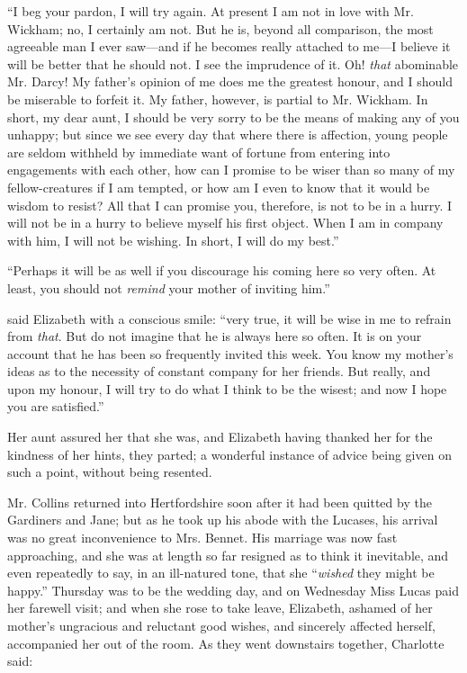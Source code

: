 “I beg your pardon, I will try again. At present I am not in love with Mr. Wickham; no, I certainly am not. But he is, beyond all comparison, the most agreeable man I ever saw---and if he becomes really attached to me---I believe it will be better that he should not. I see the imprudence of it. Oh! {\em that} abominable Mr. Darcy! My father's opinion of me does me the greatest honour, and I should be miserable to forfeit it. My father, however, is partial to Mr. Wickham. In short, my dear aunt, I should be very sorry to be the means of making any of you unhappy; but since we see every day that where there is affection, young people are seldom withheld by immediate want of fortune from entering into engagements with each other, how can I promise to be wiser than so many of my fellow-creatures if I am tempted, or how am I even to know that it would be wisdom to resist? All that I can promise you, therefore, is not to be in a hurry. I will not be in a hurry to believe myself his first object. When I am in company with him, I will not be wishing. In short, I will do my best.”

“Perhaps it will be as well if you discourage his coming here so very often. At least, you should not {\em remind} your mother of inviting him.”

 said Elizabeth with a conscious smile: “very true, it will be wise in me to refrain from {\em that}. But do not imagine that he is always here so often. It is on your account that he has been so frequently invited this week. You know my mother's ideas as to the necessity of constant company for her friends. But really, and upon my honour, I will try to do what I think to be the wisest; and now I hope you are satisfied.”

Her aunt assured her that she was, and Elizabeth having thanked her for the kindness of her hints, they parted; a wonderful instance of advice being given on such a point, without being resented.

Mr. Collins returned into Hertfordshire soon after it had been quitted by the Gardiners and Jane; but as he took up his abode with the Lucases, his arrival was no great inconvenience to Mrs. Bennet. His marriage was now fast approaching, and she was at length so far resigned as to think it inevitable, and even repeatedly to say, in an ill-natured tone, that she “{\em wished} they might be happy.” Thursday was to be the wedding day, and on Wednesday Miss Lucas paid her farewell visit; and when she rose to take leave, Elizabeth, ashamed of her mother's ungracious and reluctant good wishes, and sincerely affected herself, accompanied her out of the room. As they went downstairs together, Charlotte said:

